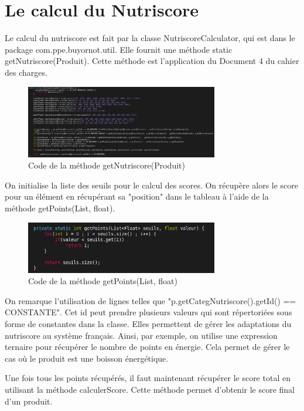 \documentclass[report]{BetterDocument}
\begin{document}
	\chapter{Le calcul du Nutriscore}

		Le calcul du nutriscore est fait par la classe NutriscoreCalculator, qui est dans le package com.ppe.buyornot.util. Elle fournit une méthode static getNutriscore(Produit). Cette méthode est l'application du Document 4 du cahier des charges.

		\begin{figure}[H]
			\centering\includegraphics[width=0.75\textwidth, keepaspectratio]{img/util/getNutriscore.png}
			\caption{Code de la méthode getNutriscore(Produit)}
		\end{figure}

		On initialise la liste des seuils pour le calcul des scores. On récupère alors le score pour un élément en récupérant sa "position" dans le tableau à l'aide de la méthode getPoints(List, float).

		\begin{figure}[H]
			\centering\includegraphics[width=0.75\textwidth, keepaspectratio]{img/util/getPoints.png}
			\caption{Code de la méthode getPoints(List, float)}
		\end{figure}

		On remarque l'utilisation de lignes telles que "p.getCategNutriscore().getId() == CONSTANTE". Cet id peut prendre plusieurs valeurs qui sont répertoriées sous forme de constantes dans la classe. Elles permettent de gérer les adaptations du nutriscore au système français. Ainsi, par exemple, on utilise une expression ternaire pour récupérer le nombre de points en énergie. Cela permet de gérer le cas où le produit est une boisson énergétique.

		Une fois tous les points récupérés, il faut maintenant récupérer le score total en utilisant la méthode calculerScore. Cette méthode permet d'obtenir le score final d'un produit.
\end{document}
